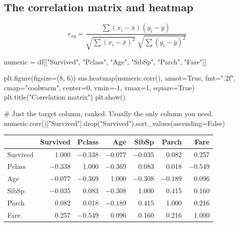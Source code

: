 \documentclass[11pt,a4paper]{article}
\begin{document}
\subsection{The correlation matrix and heatmap}


\[
  r_{xy} = \frac{\sum (x_i - \bar{x})(y_i - \bar{y})}
                {\sqrt{\sum (x_i - \bar{x})^2}\;\sqrt{\sum (y_i - \bar{y})^2}}
\]

\begin{py}
numeric = df[["Survived", "Pclass", "Age", "SibSp", "Parch", "Fare"]]

plt.figure(figsize=(8, 6))
sns.heatmap(numeric.corr(), annot=True, fmt=".2f",
            cmap="coolwarm", center=0, vmin=-1, vmax=1, square=True)
plt.title("Correlation matrix")
plt.show()

# Just the target column, ranked. Usually the only column you need.
numeric.corr()["Survived"].drop("Survived").sort_values(ascending=False)
\end{py}

\begin{tabularx}{\textwidth}{@{}l r r r r r r@{}}
\toprule
\rowcolor{tablehead} & \textbf{Survived} & \textbf{Pclass} & \textbf{Age} & \textbf{SibSp} & \textbf{Parch} & \textbf{Fare} \\
\midrule
Survived & 1.000 & $-0.338$ & $-0.077$ & $-0.035$ & 0.082 & 0.257 \\
Pclass & $-0.338$ & 1.000 & $-0.369$ & 0.083 & 0.018 & $-0.549$ \\
Age & $-0.077$ & $-0.369$ & 1.000 & $-0.308$ & $-0.189$ & 0.096 \\
SibSp & $-0.035$ & 0.083 & $-0.308$ & 1.000 & 0.415 & 0.160 \\
Parch & 0.082 & 0.018 & $-0.189$ & 0.415 & 1.000 & 0.216 \\
Fare & 0.257 & $-0.549$ & 0.096 & 0.160 & 0.216 & 1.000 \\
\bottomrule
\end{tabularx}
\end{document}
